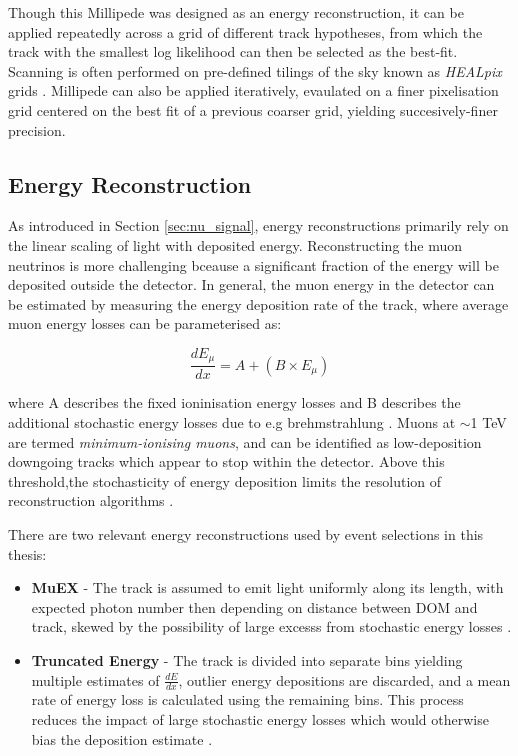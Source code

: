 Though this Millipede was designed as an energy reconstruction, it can be applied repeatedly across a grid of different track hypotheses, from which the track with the smallest log likelihood can then be selected as the best-fit. Scanning is often performed on pre-defined tilings of the sky known as \emph{HEALpix} grids . Millipede can also be applied iteratively, evaulated on a finer pixelisation grid centered on the best fit of a previous coarser grid, yielding succesively-finer precision. 
 
 \subsection*{Energy Reconstruction}
 
 As introduced in Section \ref{sec:nu_signal}, energy reconstructions primarily rely on the linear scaling of light with deposited energy. Reconstructing the muon neutrinos is more challenging bceause a significant fraction of the energy will be deposited outside the detector. In general, the muon energy in the detector can be estimated by measuring the energy deposition rate of the track, where average muon energy losses can be parameterised as:
 
 \begin{equation}
 	\frac{dE_{\mu}}{dx} = A + \left(B \times E_{\mu} \right)
 \end{equation}
 
 where A describes the fixed ioninisation energy losses and B describes the additional stochastic energy losses due to e.g brehmstrahlung . Muons at $\sim$1 TeV are termed \emph{minimum-ionising muons}, and can be identified as low-deposition downgoing tracks which appear to stop within the detector. Above this threshold,the stochasticity of energy deposition limits the resolution of reconstruction algorithms \cite{ic_energy_reco_14}. 
 
There are two relevant energy reconstructions used by event selections in this thesis:
 
 \begin{itemize}
 	\item \textbf{MuEX} - The track is assumed to emit light uniformly along its length, with expected photon number then depending on distance between DOM and track, skewed by the possibility of large excesss from stochastic energy losses \cite{kintscher_thesis}. 
 	\item \textbf{Truncated Energy} - The track is divided into separate bins yielding multiple estimates of $\frac{dE}{dx}$, outlier energy depositions are discarded, and a mean rate of energy loss is calculated using the remaining bins. This process reduces the impact of large stochastic energy losses which would otherwise bias the deposition estimate \cite{ic_truncated_energy_13}.
 \end{itemize}
 
